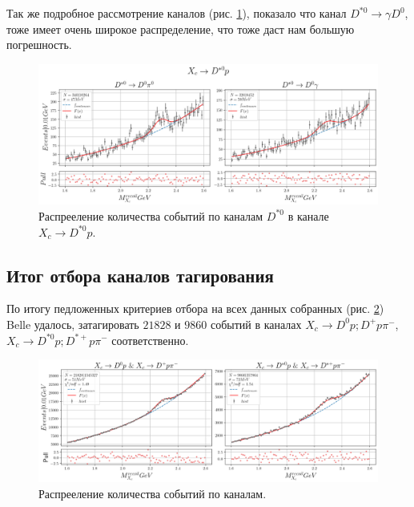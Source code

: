 Так же подробное рассмотрение каналов (рис. \ref{D_DS}), показало что канал $D^{*0} \to \gamma D^0$, 
тоже имеет очень широкое распределение, что тоже даст нам большую погрешность.

\begin{figure}[H]
    \centering
    \includegraphics[width=1\linewidth]{img/gamm_pi.png}
    \caption{Распрееление количества событий по каналам $D^{*0}$ в канале $X_c \to D^{*0} p$.}
    \label{D_DS}
\end{figure}


\subsection{Итог отбора каналов тагирования}

По итогу педложенных критериев отбора на всех данных собранных (рис. \ref{res:full_belle}) Belle удалось, затагировать 
$21828$ и $9860$ событий в каналах $X_c \to D^0 p; D^+ p \pi^-$,  $X_c \to D^{*0} p; D^{*+} p \pi^-$ 
соответственно.

\begin{figure}[H]
    \centering
    \includegraphics[width=1\linewidth]{img/tag_sum.png}
    \caption{Распрееление количества событий по каналам.}
    \label{res:full_belle}
\end{figure}
